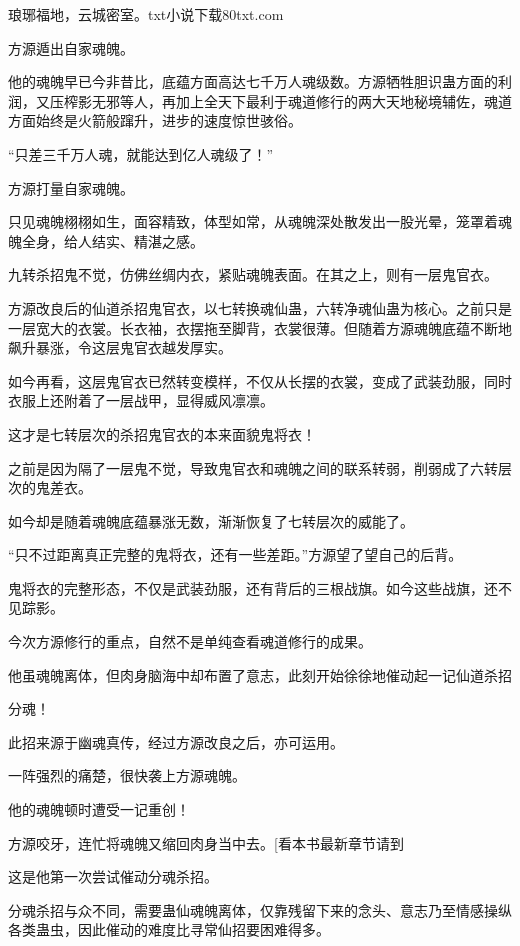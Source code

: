 
\begin{this_body}

琅琊福地，云城密室。txt小说下载80txt.com

方源遁出自家魂魄。

他的魂魄早已今非昔比，底蕴方面高达七千万人魂级数。方源牺牲胆识蛊方面的利润，又压榨影无邪等人，再加上全天下最利于魂道修行的两大天地秘境辅佐，魂道方面始终是火箭般蹿升，进步的速度惊世骇俗。

“只差三千万人魂，就能达到亿人魂级了！”

方源打量自家魂魄。

只见魂魄栩栩如生，面容精致，体型如常，从魂魄深处散发出一股光晕，笼罩着魂魄全身，给人结实、精湛之感。

九转杀招鬼不觉，仿佛丝绸内衣，紧贴魂魄表面。在其之上，则有一层鬼官衣。

方源改良后的仙道杀招鬼官衣，以七转换魂仙蛊，六转净魂仙蛊为核心。之前只是一层宽大的衣裳。长衣袖，衣摆拖至脚背，衣裳很薄。但随着方源魂魄底蕴不断地飙升暴涨，令这层鬼官衣越发厚实。

如今再看，这层鬼官衣已然转变模样，不仅从长摆的衣裳，变成了武装劲服，同时衣服上还附着了一层战甲，显得威风凛凛。

这才是七转层次的杀招鬼官衣的本来面貌鬼将衣！

之前是因为隔了一层鬼不觉，导致鬼官衣和魂魄之间的联系转弱，削弱成了六转层次的鬼差衣。

如今却是随着魂魄底蕴暴涨无数，渐渐恢复了七转层次的威能了。

“只不过距离真正完整的鬼将衣，还有一些差距。”方源望了望自己的后背。

鬼将衣的完整形态，不仅是武装劲服，还有背后的三根战旗。如今这些战旗，还不见踪影。

今次方源修行的重点，自然不是单纯查看魂道修行的成果。

他虽魂魄离体，但肉身脑海中却布置了意志，此刻开始徐徐地催动起一记仙道杀招

分魂！

此招来源于幽魂真传，经过方源改良之后，亦可运用。

一阵强烈的痛楚，很快袭上方源魂魄。

他的魂魄顿时遭受一记重创！

方源咬牙，连忙将魂魄又缩回肉身当中去。[看本书最新章节请到

这是他第一次尝试催动分魂杀招。

分魂杀招与众不同，需要蛊仙魂魄离体，仅靠残留下来的念头、意志乃至情感操纵各类蛊虫，因此催动的难度比寻常仙招要困难得多。


\end{this_body}
